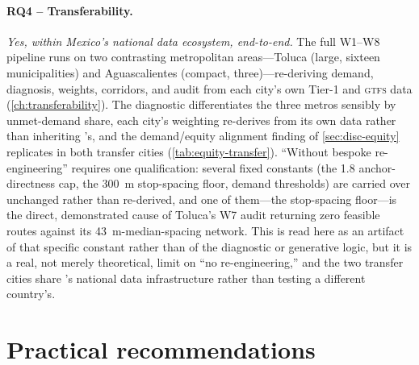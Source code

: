 \paragraph{RQ4 -- Transferability.} \emph{Yes, within Mexico's national data ecosystem,
end-to-end.} The full W1--W8 pipeline runs on two contrasting metropolitan
areas---Toluca (large, sixteen municipalities) and Aguascalientes (compact,
three)---re-deriving demand, diagnosis, weights, corridors, and audit from each
city's own Tier-1 and \textsc{gtfs} data (\cref{ch:transferability}). The diagnostic
differentiates the three metros sensibly by unmet-demand share, each city's
weighting re-derives from its own data rather than inheriting \zmg's, and the
demand/equity alignment finding of \cref{sec:disc-equity} replicates in both
transfer cities (\cref{tab:equity-transfer}). ``Without bespoke re-engineering''
requires one qualification: several fixed constants (the \num{1.8} anchor-directness
cap, the \SI{300}{\metre} stop-spacing floor, demand thresholds) are carried over
unchanged rather than re-derived, and one of them---the stop-spacing floor---is the
direct, demonstrated cause of Toluca's W7 audit returning zero feasible routes
against its \SI{43}{\metre}-median-spacing network. This is read here as an artifact
of that specific constant rather than of the diagnostic or generative logic, but it
is a real, not merely theoretical, limit on ``no re-engineering,'' and the two
transfer cities share \zmg's national data infrastructure rather than testing a
different country's.

\section{Practical recommendations}
\label{sec:concl-recommendations}

